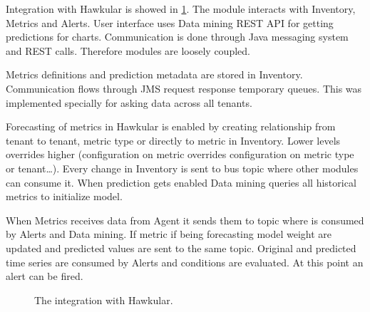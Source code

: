     Integration with Hawkular is showed in \ref{img_integration}.
    The module interacts with Inventory, Metrics and Alerts. User interface uses Data
    mining REST API for getting predictions for charts. Communication is done through 
    Java messaging system and REST calls. Therefore modules are
    loosely coupled.

    Metrics definitions and prediction metadata are stored in Inventory.
    Communication flows through JMS request response temporary queues. This was
    implemented specially for asking data across all tenants.

    Forecasting of 
    metrics in Hawkular is enabled by creating relationship from tenant to tenant, metric type
    or directly to metric in Inventory. Lower levels overrides higher (configuration on metric overrides
    configuration on metric type or tenant\dots). Every change in Inventory is sent to bus topic
    where other modules can consume it. When prediction gets enabled Data mining queries all
    historical metrics to initialize model.

    When Metrics receives data from Agent it sends them to topic where is consumed by Alerts
    and Data mining. If metric if being forecasting model weight are updated and predicted
    values are sent to the same topic. Original and predicted time series are consumed by 
    Alerts and conditions are evaluated. At this point an alert can be fired. 

    \begin{figure}[H]
        \begin{center}
            \caption{The integration with Hawkular.}
            \label{img_integration}
        \end{center}
    \end{figure}

